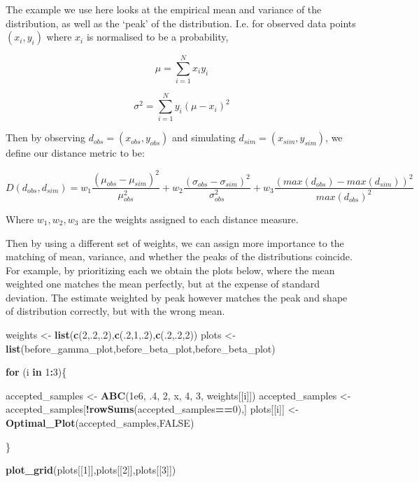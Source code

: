 \documentclass[
]{article}
\newenvironment{Shaded}{\begin{snugshade}}{\end{snugshade}}
\newcommand{\ConstantTok}[1]{\textcolor[rgb]{0.56,0.35,0.01}{#1}}
\newcommand{\ControlFlowTok}[1]{\textcolor[rgb]{0.13,0.29,0.53}{\textbf{#1}}}
\newcommand{\DecValTok}[1]{\textcolor[rgb]{0.00,0.00,0.81}{#1}}
\newcommand{\FloatTok}[1]{\textcolor[rgb]{0.00,0.00,0.81}{#1}}
\newcommand{\FunctionTok}[1]{\textcolor[rgb]{0.13,0.29,0.53}{\textbf{#1}}}
\newcommand{\NormalTok}[1]{#1}
\newcommand{\OtherTok}[1]{\textcolor[rgb]{0.56,0.35,0.01}{#1}}
\newcommand{\SpecialCharTok}[1]{\textcolor[rgb]{0.81,0.36,0.00}{\textbf{#1}}}
\begin{document}
The example we use here looks at the empirical mean and variance of the
distribution, as well as the `peak' of the distribution. I.e. for
observed data points \((x_i,y_i)\) where \(x_i\) is normalised to be a
probability,

\[
\mu = \sum_{i=1}^{N}x_i y_i
\]

\[
\sigma^2 = \sum_{i=1}^N y_i(\mu-x_i)^2
\]

Then by observing \(d_{obs} = (x_{obs},y_{obs})\) and simulating
\(d_{sim} = (x_{sim},y_{sim})\), we define our distance metric to be:

\[
D(d_{obs},d_{sim}) = w_1\frac{(\mu_{obs}-\mu_{sim})^2}{\mu_{obs}^2} + w_2\frac{(\sigma_{obs}-\sigma_{sim})^2}{\sigma_{obs}^2} + w_3\frac{(max(d_{obs})-max(d_{sim}))^2}{max(d_{obs})^2}
\]

Where \(w_1, w_2, w_3\) are the weights assigned to each distance
measure.

Then by using a different set of weights, we can assign more importance
to the matching of mean, variance, and whether the peaks of the
distributions coincide. For example, by prioritizing each we obtain the
plots below, where the mean weighted one matches the mean perfectly, but
at the expense of standard deviation. The estimate weighted by peak
however matches the peak and shape of distribution correctly, but with
the wrong mean.

\begin{Shaded}
\begin{Highlighting}[]
\NormalTok{weights }\OtherTok{\textless{}{-}} \FunctionTok{list}\NormalTok{(}\FunctionTok{c}\NormalTok{(}\DecValTok{2}\NormalTok{,.}\DecValTok{2}\NormalTok{,.}\DecValTok{2}\NormalTok{),}\FunctionTok{c}\NormalTok{(.}\DecValTok{2}\NormalTok{,}\DecValTok{1}\NormalTok{,.}\DecValTok{2}\NormalTok{),}\FunctionTok{c}\NormalTok{(.}\DecValTok{2}\NormalTok{,.}\DecValTok{2}\NormalTok{,}\DecValTok{2}\NormalTok{))}
\NormalTok{plots }\OtherTok{\textless{}{-}} \FunctionTok{list}\NormalTok{(before\_gamma\_plot,before\_beta\_plot,before\_beta\_plot)}

\ControlFlowTok{for}\NormalTok{ (i }\ControlFlowTok{in} \DecValTok{1}\SpecialCharTok{:}\DecValTok{3}\NormalTok{)\{}
  
\NormalTok{  accepted\_samples }\OtherTok{\textless{}{-}} \FunctionTok{ABC}\NormalTok{(}\FloatTok{1e6}\NormalTok{, .}\DecValTok{4}\NormalTok{, }\DecValTok{2}\NormalTok{, x, }\DecValTok{4}\NormalTok{, }\DecValTok{3}\NormalTok{, weights[[i]])}
\NormalTok{  accepted\_samples }\OtherTok{\textless{}{-}}\NormalTok{ accepted\_samples[}\SpecialCharTok{!}\FunctionTok{rowSums}\NormalTok{(accepted\_samples}\SpecialCharTok{==}\DecValTok{0}\NormalTok{),]}
\NormalTok{  plots[[i]] }\OtherTok{\textless{}{-}} \FunctionTok{Optimal\_Plot}\NormalTok{(accepted\_samples,}\ConstantTok{FALSE}\NormalTok{)}
  
\NormalTok{\}}

\FunctionTok{plot\_grid}\NormalTok{(plots[[}\DecValTok{1}\NormalTok{]],plots[[}\DecValTok{2}\NormalTok{]],plots[[}\DecValTok{3}\NormalTok{]])}
\end{Highlighting}
\end{Shaded}
\end{document}
